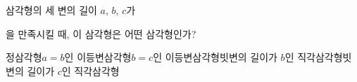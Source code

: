 삼각형의 세 변의 길이 $a$, $b$, $c$가\par\smallskip{}\par\smallskip\noindent 을 만족시킬 때, 이 삼각형은 어떤 삼각형인가?
\begin{choicesv}{정삼각형}{$a=b$인 이등변삼각형}{$b=c$인 이등변삼각형}{빗변의 길이가 $b$인 직각삼각형}{빗변의 길이가 $c$인 직각삼각형}\end{choicesv}
